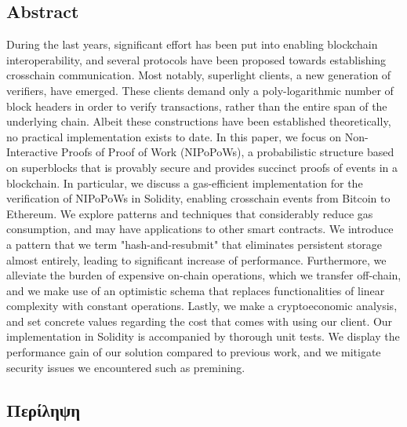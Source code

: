 \begin{center}
    \section*{Abstract}
\end{center}

During the last years, significant effort has been put into enabling blockchain
interoperability, and several protocols have been proposed towards establishing
crosschain communication. Most notably, superlight clients, a new generation of
verifiers, have emerged. These clients demand only a poly-logarithmic number of
block headers in order to verify transactions, rather than the entire span of
the underlying chain. Albeit these constructions have been established
theoretically, no practical implementation exists to date. In this paper, we
focus on Non-Interactive Proofs of Proof of Work (NIPoPoWs), a probabilistic
structure based on superblocks that is provably secure and provides succinct
proofs of events in a blockchain. In particular, we discuss a gas-efficient
implementation for the verification of NIPoPoWs in Solidity, enabling
crosschain events from Bitcoin to Ethereum. We explore patterns and techniques
that considerably reduce gas consumption, and may have applications to other
smart contracts. We introduce a pattern that we term "hash-and-resubmit" that
eliminates persistent storage almost entirely, leading to significant increase
of performance. Furthermore, we alleviate the burden of expensive on-chain
operations, which we transfer off-chain, and we make use of an optimistic
schema that replaces functionalities of linear complexity with constant
operations. Lastly, we make a cryptoeconomic analysis, and set concrete values
regarding the cost that comes with using our client. Our implementation in
Solidity is accompanied by thorough unit tests. We display the performance gain
of our solution compared to previous work, and we mitigate security issues we
encountered such as premining.

\newpage

\begin{center}
    \section*{Περίληψη}
\end{center}

